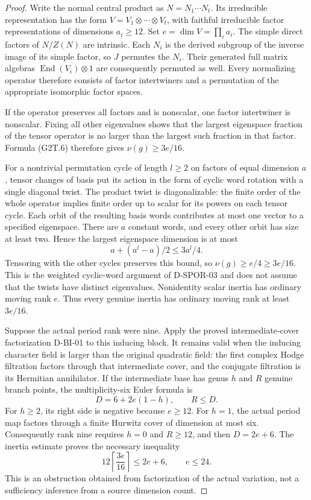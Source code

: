 \begin{proof}
Write the normal central product as $N=N_1\cdots N_t$.
Its irreducible representation has the form
$V=V_1\otimes\cdots\otimes V_t$, with faithful irreducible
factor representations of dimensions $a_i\ge12$.
Set $e=\dim V=\prod_i a_i$.  The simple direct factors of
$N/Z(N)$ are intrinsic.  Each $N_i$ is the derived subgroup
of the inverse image of its simple factor, so $J$ permutes
the $N_i$.  Their generated full matrix algebras
$\operatorname{End}(V_i)\otimes1$ are consequently permuted
as well.  Every normalizing operator therefore consists of
factor intertwiners and a permutation of the appropriate
isomorphic factor spaces.

If the operator preserves all factors and is nonscalar,
one factor intertwiner is nonscalar.  Fixing all other
eigenvalues shows that the largest eigenspace fraction of
the tensor operator is no larger than the largest such
fraction in that factor.  Formula (G2T.6) therefore gives
$\nu(g)\ge3e/16$.

For a nontrivial permutation cycle of length $l\ge2$ on
factors of equal dimension $a$, tensor changes of basis
put its action in the form of cyclic word rotation with
a single diagonal twist.  The product twist is diagonalizable:
the finite order of the whole operator implies finite order
up to scalar for its powers on each tensor cycle.
Each orbit of the resulting basis words contributes at most
one vector to a specified eigenspace.  There are $a$ constant
words, and every other orbit has size at least two.  Hence
the largest eigenspace dimension is at most
\[
                    a+(a^l-a)/2\le3a^l/4.
\]
Tensoring with the other cycles preserves this bound, so
$\nu(g)\ge e/4\ge3e/16$.  This is the weighted cyclic-word
argument of D-SPOR-03 and does not assume that the twists
have distinct eigenvalues.  Nonidentity scalar inertia has
ordinary moving rank $e$.  Thus every genuine inertia has
ordinary moving rank at least $3e/16$.

Suppose the actual period rank were nine.  Apply the proved
intermediate-cover factorization D-BI-01 to this inducing
block.  It remains valid when the inducing character field
is larger than the original quadratic field: the first
complex Hodge filtration factors through that intermediate
cover, and the conjugate filtration is its Hermitian
annihilator.  If the intermediate base has genus $h$ and
$R$ genuine branch points, the multiplicity-six Euler formula is
\[
                      D=6+2e(1-h),\qquad R\le D.           \tag{G2T.9}
\]
For $h\ge2$, its right side is negative because $e\ge12$.
For $h=1$, the actual period map factors through a finite
Hurwitz cover of dimension at most six.  Consequently rank
nine requires $h=0$ and $R\ge12$, and then $D=2e+6$.
The inertia estimate proves the necessary inequality
\[
              12\left\lceil\frac{3e}{16}\right\rceil
                   \le2e+6,
                   \qquad e\le24.                        \tag{G2T.10}
\]
This is an obstruction obtained from factorization of the
actual variation, not a sufficiency inference from a source
dimension count.


\end{proof}
